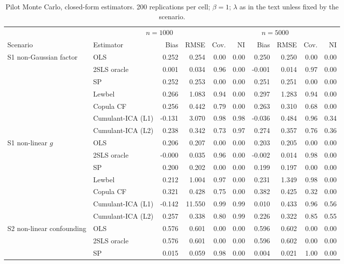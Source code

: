\begin{table}[p]
\centering
\scriptsize
\setlength{\tabcolsep}{2.5pt}
\caption{Pilot Monte Carlo, closed-form estimators.  200 replications per cell; $\beta=1$; $\lambda$ as in the text unless fixed by the scenario.}\label{tab:pilot-fast}
\begin{tabular}{@{}llrrrrrrrr@{}}
\toprule
 & \multicolumn{4}{c}{$n=1000$} & \multicolumn{4}{c}{$n=5000$} \\
\cmidrule(lr){3-6} \cmidrule(lr){7-10}
Scenario & Estimator & Bias & RMSE & Cov. & NI & Bias & RMSE & Cov. & NI \\
\midrule
S1 non-Gaussian factor & OLS & 0.252 & 0.254 & 0.00 & 0.00 & 0.250 & 0.250 & 0.00 & 0.00 \\
 & 2SLS oracle & 0.001 & 0.034 & 0.96 & 0.00 & -0.001 & 0.014 & 0.97 & 0.00 \\
 & SP & 0.252 & 0.253 & 0.00 & 0.00 & 0.251 & 0.251 & 0.00 & 0.00 \\
 & Lewbel & 0.266 & 1.083 & 0.94 & 0.00 & 0.297 & 1.283 & 0.94 & 0.00 \\
 & Copula CF & 0.256 & 0.442 & 0.79 & 0.00 & 0.263 & 0.310 & 0.68 & 0.00 \\
 & Cumulant-ICA (L1) & -0.131 & 3.070 & 0.98 & 0.98 & -0.036 & 0.484 & 0.96 & 0.34 \\
 & Cumulant-ICA (L2) & 0.238 & 0.342 & 0.73 & 0.97 & 0.274 & 0.357 & 0.76 & 0.36 \\
\addlinespace
S1 non-linear $g$ & OLS & 0.206 & 0.207 & 0.00 & 0.00 & 0.203 & 0.205 & 0.00 & 0.00 \\
 & 2SLS oracle & -0.000 & 0.035 & 0.96 & 0.00 & -0.002 & 0.014 & 0.98 & 0.00 \\
 & SP & 0.200 & 0.202 & 0.00 & 0.00 & 0.199 & 0.197 & 0.00 & 0.00 \\
 & Lewbel & 0.212 & 1.004 & 0.97 & 0.00 & 0.231 & 1.349 & 0.98 & 0.00 \\
 & Copula CF & 0.321 & 0.428 & 0.75 & 0.00 & 0.382 & 0.425 & 0.32 & 0.00 \\
 & Cumulant-ICA (L1) & -0.142 & 11.550 & 0.99 & 0.99 & 0.010 & 0.433 & 0.96 & 0.56 \\
 & Cumulant-ICA (L2) & 0.257 & 0.338 & 0.80 & 0.99 & 0.226 & 0.322 & 0.85 & 0.55 \\
\addlinespace
S2 non-linear confounding & OLS & 0.576 & 0.601 & 0.00 & 0.00 & 0.596 & 0.602 & 0.00 & 0.00 \\
 & 2SLS oracle & 0.576 & 0.601 & 0.00 & 0.00 & 0.596 & 0.602 & 0.00 & 0.00 \\
 & SP & 0.015 & 0.059 & 0.98 & 0.00 & 0.004 & 0.021 & 1.00 & 0.00 \\

\end{tabular}
\end{table}
